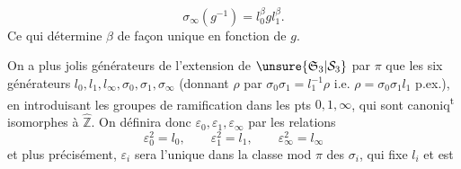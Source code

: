 \[
\sigma_\infty(g^{-1})=l_0^\beta g l_1^\beta.
\]
Ce qui détermine $\beta$ de façon unique en fonction de $g$.


On a  plus jolis générateurs de  l'extension de $\unsure{\mathfrak S_3|\mathcal S_3}$ par $\pi$  que les six générateurs $l_0,l_1,l_\infty,\sigma_0,\sigma_1,\sigma_\infty$ (donnant $\rho$ par $\sigma_0\sigma_1=l_1^{-1}\rho$  i.e. $\rho=\sigma_0\sigma_1l_1$ p.ex.), en introduisant les groupes de ramification dans les pts $0,1,\infty$, qui sont canoniq\textsuperscript{t} isomorphes à $\widehat{\mathbb Z}$.
On définira donc $\varepsilon_0,\varepsilon_1,\varepsilon_\infty$ par les relations
\[
\varepsilon_0^2=l_0,\qquad\varepsilon_1^2=l_1,\qquad\varepsilon_\infty^2=l_\infty
\]
et plus précisément, $\varepsilon_i$ sera l'unique   dans la classe mod $\pi$ des $\sigma_i$,  qui fixe $l_i$ et est  
